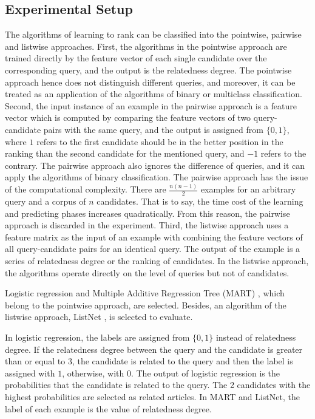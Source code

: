 \subsection{Experimental Setup}
\label{sec:6.3}

The algorithms of learning to rank can be classified into the pointwise, pairwise and listwise approaches. First, the algorithms in the pointwise approach are trained directly by the feature vector of each single candidate over the corresponding query, and the output is the relatedness degree. The pointwise approach hence does not distinguish different queries, and moreover, it can be treated as an application of the algorithms of binary or multiclass classification. Second, the input instance of an example in the pairwise approach is a feature vector which is computed by comparing the feature vectors of two query-candidate pairs with the same query, and the output is assigned from $\{0, 1\}$, where $1$ refers to the first candidate should be in the better position in the ranking than the second candidate for the mentioned query, and $-1$ refers to the contrary. The pairwise approach also ignores the difference of queries, and it can apply the algorithms of binary classification. The pairwise approach has the issue of the computational complexity. There are $\frac{n(n-1)}{2}$ examples for an arbitrary query and a corpus of $n$ candidates. That is to say, the time cost of the learning and predicting phases increases quadratically. From this reason, the pairwise approach is discarded in the experiment. Third, the listwise approach uses a feature matrix as the input of an example with combining the feature vectors of all query-candidate pairs for an identical query. The output of the example is a series of relatedness degree or the ranking of candidates. In the listwise approach, the algorithms operate directly on the level of queries but not of candidates. 

Logistic regression and Multiple Additive Regression Tree (MART) \citep{friedman2002stochastic}, which belong to the pointwise approach, are selected. Besides, an algorithm of the listwise approach, ListNet \citep{cao2007learning}, is selected to evaluate. 

In logistic regression, the labels are assigned from $\{0, 1\}$ instead of relatedness degree. If the relatedness degree between the query and the candidate is greater than or equal to $3$, the candidate is related to the query and then the label is assigned with $1$, otherwise, with $0$. The output of logistic regression is the probabilities that the candidate is related to the query. The 2 candidates with the highest probabilities are selected as related articles. In MART and ListNet, the label of each example is the value of relatedness degree. 

